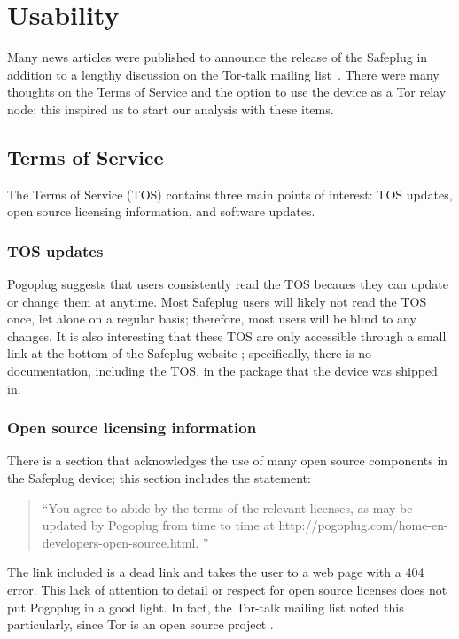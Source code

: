\section{Usability}
\label{sec:usability}

Many news articles were published to announce the release of the Safeplug in addition to a lengthy discussion on the Tor-talk mailing list~\cite{tormailinglist}.  There were many thoughts on the Terms of Service and the option to use the device as a Tor relay node; this inspired us to start our analysis with these items.  

\subsection{Terms of Service}
\label{tos}
The Terms of Service (TOS) contains three main points of interest: TOS updates, open source licensing information, and software updates.

\subsubsection{TOS updates} Pogoplug suggests that users consistently read the TOS becaues they can update or change them at anytime.  Most Safeplug users will likely not read the TOS once, let alone on a regular basis; therefore, most users will be blind to any changes.  It is also interesting that these TOS are only accessible through a small link at the bottom of the Safeplug website \cite{safeplug}; specifically, there is no documentation, including the TOS, in the package that the device was shipped in.

\subsubsection{Open source licensing information}  There is a section that acknowledges the use of many open source components in the Safeplug device; this section includes the statement: 

\begin{quotation}
``You agree to abide by the terms of the relevant licenses, as may be updated by Pogoplug from time to time at http://pogoplug.com/home-en-developers-open-source.html. '' \cite{safeplug}
\end{quotation}

The link included is a dead link and takes the user to a web page with a 404 error.  This lack of attention to detail or respect for open source licenses does not put Pogoplug in a good light.  In fact, the Tor-talk mailing list noted this particularly, since Tor is an open source project \cite{tormailinglist}.

